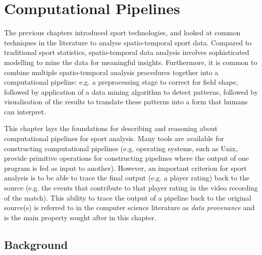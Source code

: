 \chapter{Computational Pipelines}
\label{ch:prov}
\startchapter

The previous chapters introduced sport technologies, and looked at common techniques in the literature to analyse spatio-temporal sport data. Compared to traditional sport statistics, spatio-temporal data analysis involves sophisticated modelling to mine the data for meaningful insights. Furthermore, it is common to combine multiple spatio-temporal analysis procedures together into a computational pipeline: e.g. a preprocessing stage to correct for field shape, followed by application of a data mining algorithm to detect patterns, followed by visualisation of the results to translate these patterns into a form that humans can interpret.

This chapter lays the foundations for describing and reasoning about computational pipelines for sport analysis. Many tools are available for constructing computational pipelines (e.g. operating systems, such as Unix, provide primitive operations for constructing pipelines where the output of one program is fed as input to another). However, an important criterion for sport analysis is to be able to trace the final output (e.g. a player rating) back to the source (e.g. the events that contribute to that player rating in the video recording of the match). This ability to trace the output of a pipeline back to the original source(s) is referred to in the computer science literature as \textit{data provenance} and is the main property sought after in this chapter.

\section{Background}


